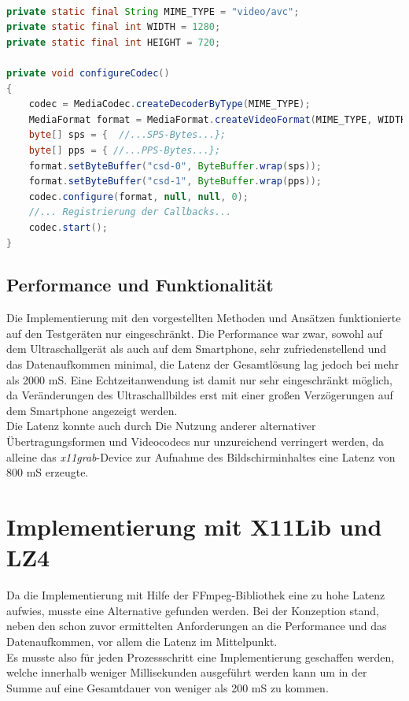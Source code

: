 \begin{lstlisting}[caption=Konfiguration des MediaCodec, label=lst:config_media_codec, language=Java]

private static final String MIME_TYPE = "video/avc";
private static final int WIDTH = 1280;
private static final int HEIGHT = 720;

private void configureCodec()
{
	codec = MediaCodec.createDecoderByType(MIME_TYPE);
	MediaFormat format = MediaFormat.createVideoFormat(MIME_TYPE, WIDTH, HEIGHT);
	byte[] sps = {  //...SPS-Bytes...};
	byte[] pps = { //...PPS-Bytes...};
	format.setByteBuffer("csd-0", ByteBuffer.wrap(sps));
	format.setByteBuffer("csd-1", ByteBuffer.wrap(pps));
	codec.configure(format, null, null, 0);
	//... Registrierung der Callbacks...
	codec.start();
}
\end{lstlisting}

\subsection{Performance und Funktionalität}
Die Implementierung mit den vorgestellten Methoden und Ansätzen funktionierte auf den Testgeräten nur eingeschränkt. Die Performance war zwar, sowohl auf dem Ultraschallgerät als auch auf dem Smartphone, sehr zufriedenstellend und das Datenaufkommen minimal, die Latenz der Gesamtlösung lag jedoch bei mehr als 2000 mS. Eine Echtzeitanwendung ist damit nur sehr eingeschränkt möglich, da Veränderungen des Ultraschallbildes erst mit einer großen Verzögerungen auf dem Smartphone angezeigt werden.\\
Die Latenz konnte auch durch Die Nutzung anderer alternativer Übertragungsformen und Videocodecs nur unzureichend verringert werden, da alleine das \textit{x11grab}-Device zur Aufnahme des Bildschirminhaltes eine Latenz von 800 mS erzeugte. \\

\section{Implementierung mit X11Lib und LZ4}
Da die Implementierung mit Hilfe der FFmpeg-Bibliothek eine zu hohe Latenz aufwies, musste eine Alternative gefunden werden. Bei der Konzeption stand, neben den schon zuvor ermittelten Anforderungen an die Performance und das Datenaufkommen, vor allem die Latenz im Mittelpunkt.\\ Es musste also für jeden Prozessschritt eine Implementierung geschaffen werden, welche innerhalb weniger Millisekunden ausgeführt werden kann um in der Summe auf eine Gesamtdauer von weniger als 200 mS zu kommen. 

